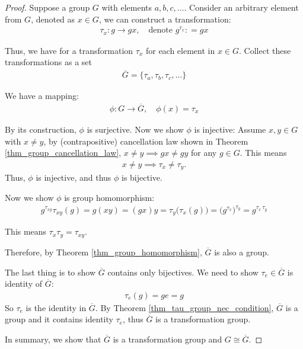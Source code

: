 \documentclass[utf8]{ctexbook}
\theoremstyle{definition}
\begin{document}
\begin{proof}
Suppose a group $G$ with elements $a, b, c, \ldots$.
Consider an arbitrary element from $G$, denoted as $x \in G$, we can construct a transformation:
\begin{align*}
\tau_x : g \longrightarrow gx, \quad \mbox{denote } g^{\tau_x} : = g x
\end{align*}

Thus, we have for a transformation $\tau_x$ for each element in $x \in G$. Collect these transformations as a set
\begin{align*}
\overline{G} = \{ \tau_a, \tau_b, \tau_c, \ldots \}
\end{align*}

We have a mapping:
\begin{align*}
\phi: G \longrightarrow \overline{G}, \quad \phi(x) = \tau_x
\end{align*}

By its construction, $\phi$ is surjective. Now we show $\phi$ is injective: Assume $x, y \in G$ with $x \neq y$, by (contrapositive) cancellation law shown in Theorem \ref{thm_group_cancellation_law}, $x \neq y \implies gx \neq gy$ for any $g \in G$. This means 
\begin{align*}
x \neq y \implies \tau_x \neq \tau_y .
\end{align*}
Thus, $\phi$ is injective, and thus $\phi$ is bijective.

Now we show $\phi$ is group homomorphism:
\begin{align*}
g^{\tau_{xy}} \tau_{xy} (g) = g (xy) = (gx)y = \tau_y \big( \tau_x (g) \big) = \big( g^{\tau_x} \big)^{\tau_y} = g^{\tau_x \, \tau_y} 
\end{align*}

This means $\tau_x \tau_y = \tau_{xy}$.

Therefore, by Theorem \ref{thm_group_homomorphism}, $\overline{G}$ is also a group.

The last thing is to show $\overline{G}$ contains only bijectives. We need to show $\tau_e \in \overline{G} $ is identity of $\overline{G}$:
\begin{align*}
\tau_e (g) = g e = g 
\end{align*}
So $\tau_e$ is the identity in $\overline{G}$.  By Theorem \ref{thm_tau_group_nec_condition}, $\overline{G}$ is a group and it contains identity $\tau_e$, thus $\overline{G}$ is a transformation group.

In summary, we show that $\overline{G}$ is a transformation group and $G \cong \overline{G}$.

\end{proof}
\end{document}
